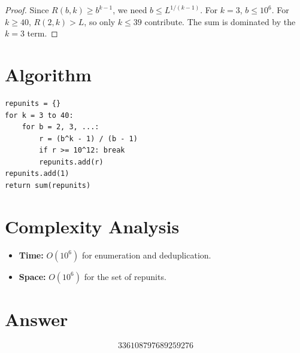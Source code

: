 \documentclass[a4paper,12pt]{article}
\begin{document}
\begin{proof}
Since $R(b,k) \ge b^{k-1}$, we need $b \le L^{1/(k-1)}$. For $k = 3$, $b \le 10^6$. For $k \ge 40$, $R(2,k) > L$, so only $k \le 39$ contribute. The sum is dominated by the $k=3$ term.
\end{proof}

\section{Algorithm}

\begin{verbatim}
repunits = {}
for k = 3 to 40:
    for b = 2, 3, ...:
        r = (b^k - 1) / (b - 1)
        if r >= 10^12: break
        repunits.add(r)
repunits.add(1)
return sum(repunits)
\end{verbatim}

\section{Complexity Analysis}
\begin{itemize}
    \item \textbf{Time:} $O(10^6)$ for enumeration and deduplication.
    \item \textbf{Space:} $O(10^6)$ for the set of repunits.
\end{itemize}

\section{Answer}

\[
\boxed{336108797689259276}
\]
\end{document}
